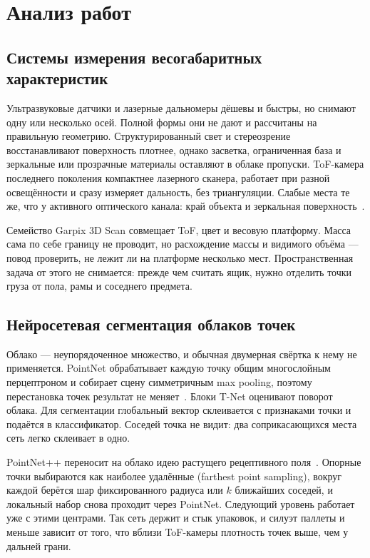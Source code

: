 \documentclass{misisarticle}
\begin{document}
\section{Анализ работ}

\subsection{Системы измерения весогабаритных характеристик}

Ультразвуковые датчики и лазерные дальномеры дёшевы и быстры, но снимают одну или несколько осей. Полной формы они не дают и рассчитаны на правильную геометрию. Структурированный свет и стереозрение восстанавливают поверхность плотнее, однако засветка, ограниченная база и зеркальные или прозрачные материалы оставляют в облаке пропуски. ToF-камера последнего поколения компактнее лазерного сканера, работает при разной освещённости и сразу измеряет дальность, без триангуляции. Слабые места те же, что у активного оптического канала: край объекта и зеркальная поверхность~\cite{garpix}.

Семейство Garpix 3D Scan совмещает ToF, цвет и весовую платформу. Масса сама по себе границу не проводит, но расхождение массы и видимого объёма --- повод проверить, не лежит ли на платформе несколько мест. Пространственная задача от этого не снимается: прежде чем считать ящик, нужно отделить точки груза от пола, рамы и соседнего предмета.

\subsection{Нейросетевая сегментация облаков точек}

Облако --- неупорядоченное множество, и обычная двумерная свёртка к нему не применяется. PointNet обрабатывает каждую точку общим многослойным перцептроном и собирает сцену симметричным max pooling, поэтому перестановка точек результат не меняет~\cite{pointnet}. Блоки T-Net оценивают поворот облака. Для сегментации глобальный вектор склеивается с признаками точки и подаётся в классификатор. Соседей точка не видит: два соприкасающихся места сеть легко склеивает в одно.

PointNet++ переносит на облако идею растущего рецептивного поля~\cite{pointnetpp}. Опорные точки выбираются как наиболее удалённые (farthest point sampling), вокруг каждой берётся шар фиксированного радиуса или $k$ ближайших соседей, и локальный набор снова проходит через PointNet. Следующий уровень работает уже с этими центрами. Так сеть держит и стык упаковок, и силуэт паллеты и меньше зависит от того, что вблизи ToF-камеры плотность точек выше, чем у дальней грани.
\end{document}
